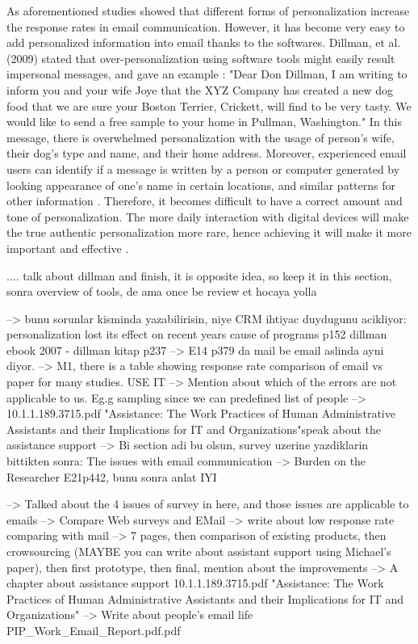 As aforementioned studies showed that different forms of personalization increase the response rates in email communication. However, it has become very easy to add personalized information into email thanks to the softwares. Dillman, et al. (2009) stated that over-personalization using software tools might easily result impersonal messages, and gave an example \cite[page 237-238]{DillmanDonA.SmythJoleneD.Christian2009}: "Dear Don Dillman, I am writing to inform you and your wife Joye that the XYZ Company has created a new dog food that we are sure your Boston Terrier, Crickett, will find to be very tasty. We would like to send a free sample to your home in Pullman, Washington." In this message, there is overwhelmed personalization with the usage of person's wife, their dog's type and name, and their home address. Moreover, experienced email users can identify if a message is written by a person or computer generated by looking appearance of one's name in certain locations, and similar patterns for other information \cite[page 272]{DillmanDonA.SmythJoleneD.Christian2009}. Therefore, it becomes difficult to have a correct amount and tone of personalization. The more daily interaction with digital devices will make the true authentic personalization more rare, hence achieving it will make it more important and effective \cite[page 238]{DillmanDonA.SmythJoleneD.Christian2009}.


 



 .... talk about dillman and finish, it is opposite idea, so keep it in this section, sonra overview of tools, de ama once be review et hocaya yolla

--> bunu sorunlar kisminda yazabilirisin, niye CRM ihtiyac duydugunu acikliyor: personalization lost its effect on recent years cause of programs p152 dillman ebook 2007 - dillman kitap p237
--> E14 p379 da mail be email aslinda ayni diyor.
--> M1, there is a table showing response rate comparison of email vs paper for many studies. USE IT
--> Mention about which of the errors are not applicable to us. Eg.g sampling since we can predefined list of people
--> 10.1.1.189.3715.pdf "Assistance: The Work Practices of Human Administrative Assistants and their Implications for IT and Organizations"speak about the assistance support
--> Bi section adi bu olsun, survey uzerine yazdiklarin bittikten sonra: The issues with email communication
--> Burden on the Researcher E21p442, bunu sonra anlat IYI

--> Talked about the 4 issues of survey in here, and those issues are applicable to emails
--> Compare Web surveys and EMail
--> write about low response rate comparing with mail
--> 7 pages, then comparison of existing products, then crowsourcing (MAYBE you can write about assistant support using Michael's paper), then first prototype, then final, mention about the improvements
--> A chapter about assistance support 10.1.1.189.3715.pdf "Assistance: The Work Practices of Human Administrative Assistants and their Implications for IT and Organizations"
--> Write about people's email life PIP_Work_Email_Report.pdf.pdf


